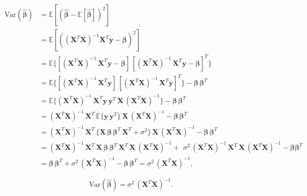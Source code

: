 \begin{align*}
\mbox{Var}(\boldsymbol{\hat{\beta}}) 
&= \mathbb{E}[(\boldsymbol{\hat\beta} - \mathbb{E}[\boldsymbol{\hat\beta}])^2 ]
\\
&= \mathbb{E}[((\mathbf{X}^T\mathbf{X})^{-1}\mathbf{X}^T\mathbf{y}-\boldsymbol\beta)^2] 
\\
&= \mathbb{E} \{ [(\mathbf{X}^{T} \mathbf{X})^{-1} \, \mathbf{X}^{T} \mathbf{y} - \boldsymbol{\beta}] \, [(\mathbf{X}^{T} \mathbf{X})^{-1} \, \mathbf{X}^{T} \mathbf{y} - \boldsymbol{\beta}]^{T} \}
\\
&=  \mathbb{E} \{ [(\mathbf{X}^{T} \mathbf{X})^{-1} \, \mathbf{X}^{T} \mathbf{y}] \, [(\mathbf{X}^{T} \mathbf{X})^{-1} \, \mathbf{X}^{T} \mathbf{y}]^{T} \} - \boldsymbol{\beta} \, \boldsymbol{\beta}^{T}
\\
&=  \mathbb{E} \{ (\mathbf{X}^{T} \mathbf{X})^{-1} \, \mathbf{X}^{T} \mathbf{y} \, \mathbf{y}^{T} \, \mathbf{X} \, (\mathbf{X}^{T} \mathbf{X})^{-1}  \} - \boldsymbol{\beta} \, \boldsymbol{\beta}^{T}
\\
&= (\mathbf{X}^{T} \mathbf{X})^{-1} \, \mathbf{X}^{T} \, \mathbb{E} \{ \mathbf{y} \, \mathbf{y}^{T} \} \, \mathbf{X} \, (\mathbf{X}^{T} \mathbf{X})^{-1} - \boldsymbol{\beta} \, \boldsymbol{\beta}^{T}
\\
&= (\mathbf{X}^{T} \mathbf{X})^{-1} \, \mathbf{X}^{T} \, \{ \mathbf{X} \, \boldsymbol{\beta} \, \boldsymbol{\beta}^{T} \,  \mathbf{X}^{T} + \sigma^2 \} \, \mathbf{X} \, (\mathbf{X}^{T} \mathbf{X})^{-1} - \boldsymbol{\beta} \, \boldsymbol{\beta}^{T}
\\
&= (\mathbf{X}^T \mathbf{X})^{-1} \, \mathbf{X}^T \, \mathbf{X} \, \boldsymbol{\beta} \, \boldsymbol{\beta}^T \,  \mathbf{X}^T \, \mathbf{X} \, (\mathbf{X}^T  \mathbf{X})^{-1} +  \, \, \sigma^2 \, (\mathbf{X}^T \mathbf{X})^{-1} \, \mathbf{X}^T  \, \mathbf{X} \, (\mathbf{X}^T \mathbf{X})^{-1} - \boldsymbol{\beta} \boldsymbol{\beta}^T
\\
&= \boldsymbol{\beta} \, \boldsymbol{\beta}^{T}  + \sigma^2 \, (\mathbf{X}^{T} \mathbf{X})^{-1} - \boldsymbol{\beta} \, \boldsymbol{\beta}^{T}
 =  \sigma^2 \, (\mathbf{X}^{T} \mathbf{X})^{-1},
\end{align*}

\begin{equation}\label{eq:var_beta_app}
\mbox{Var}(\boldsymbol{\hat{\beta}})  = \sigma^2 \, (\mathbf{X}^{T} \mathbf{X})^{-1}.
\end{equation}
